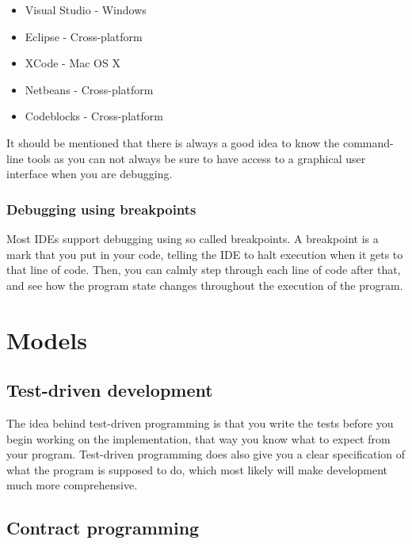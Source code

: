 \documentclass[11pt,a4paper,twoside]{article}
\begin{document}
\begin{itemize}
\item Visual Studio - Windows
\item Eclipse - Cross-platform
\item XCode - Mac OS X
\item Netbeans - Cross-platform
\item Codeblocks - Cross-platform
\end{itemize}


It should be mentioned that there is always a good idea to know the
command-line tools as you can not always be sure to have access to a graphical
user interface when you are debugging.  

\subsubsection{Debugging using breakpoints}

Most IDEs support debugging using so called breakpoints. A breakpoint is a mark
that you put in your code, telling the IDE to halt execution when it gets to
that line of code. Then, you can calmly step through each line of code after
that, and see how the program state changes throughout the execution of the
program.


\section{Models}

\subsection{Test-driven development}

The idea behind test-driven programming is that you write the tests before you
begin working on the implementation, that way you know what to expect from your
program. Test-driven programming does also give you a clear specification of
what the program is supposed to do, which most likely will make development
much more comprehensive.


\subsection{Contract programming}
\end{document}
